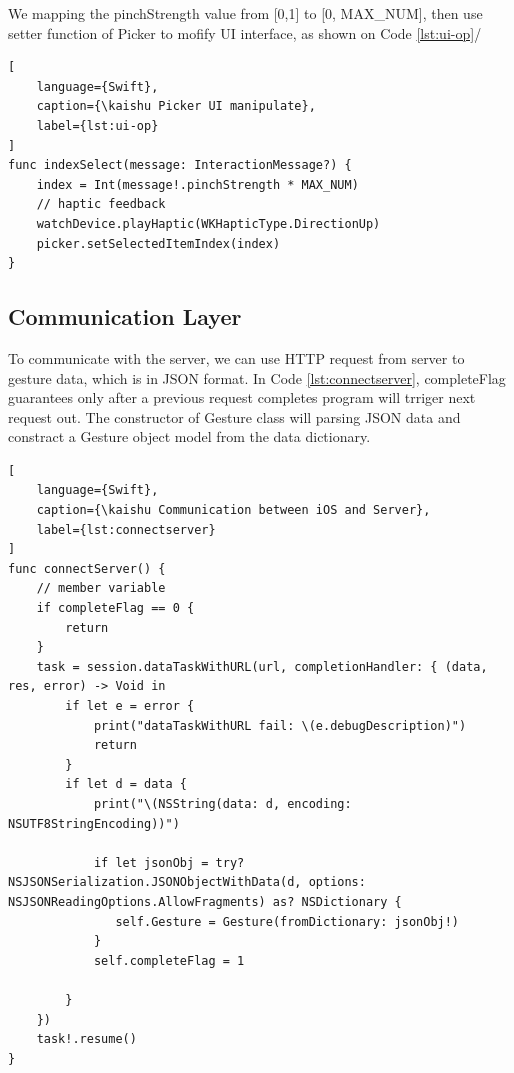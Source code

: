 We mapping the pinchStrength value from [0,1] to [0, MAX\_NUM], then use setter function of Picker to mofify UI interface, as shown on Code \ref{lst:ui-op}/

\begin{lstlisting}[
    language={Swift},
    caption={\kaishu Picker UI manipulate},
    label={lst:ui-op}
]
func indexSelect(message: InteractionMessage?) {
    index = Int(message!.pinchStrength * MAX_NUM)
    // haptic feedback
    watchDevice.playHaptic(WKHapticType.DirectionUp)
    picker.setSelectedItemIndex(index)
}
\end{lstlisting}

\subsection{Communication Layer}

To communicate with the server, we can use HTTP request from server to gesture data, which is in JSON format. In Code \ref{lst:connectserver}, completeFlag guarantees only after a previous request completes program will trriger next request out. The constructor of Gesture class will parsing JSON data and constract a Gesture object model from the data dictionary.

\begin{lstlisting}[
    language={Swift},
    caption={\kaishu Communication between iOS and Server},
    label={lst:connectserver}
]
func connectServer() {
    // member variable
    if completeFlag == 0 {
        return
    }
    task = session.dataTaskWithURL(url, completionHandler: { (data, res, error) -> Void in
        if let e = error {
            print("dataTaskWithURL fail: \(e.debugDescription)")
            return
        }
        if let d = data {
            print("\(NSString(data: d, encoding: NSUTF8StringEncoding))")

            if let jsonObj = try? NSJSONSerialization.JSONObjectWithData(d, options: NSJSONReadingOptions.AllowFragments) as? NSDictionary {
               self.Gesture = Gesture(fromDictionary: jsonObj!)
            }
            self.completeFlag = 1

        }
    })
    task!.resume()
}
\end{lstlisting}

